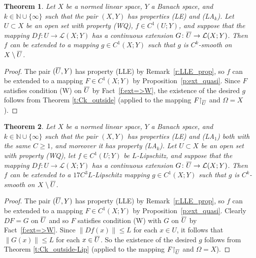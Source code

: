 \documentclass[a4paper,twoside,10pt,reqno,draft]{amsart}
\newtheorem{theorem}{Theorem}
\theoremstyle{definition}
\theoremstyle{remark}
\newcommand\norm[1]{\mathopen\|#1\mathclose\|}
\newcommand{\cl}[2][3]{{}\mkern#1mu\overline{\mkern-#1mu#2}}
\newcommand\Om{\Omega}
\newcommand\N{{\mathbb N}}
\newcommand\restr[1]{\mathclose\restriction_{#1}}
\newcommand\lin[2]{\mathcal L(#1;#2)}
\newcommand\pLA[1]{(LA$_#1$)}
\newcommand\pLLE{(LLE)}
\newcommand\pLE{(LE)}
\newcommand\pWQ{(WQ)}
\newcommand\cW{(W)}
\begin{document}
\begin{theorem}%
Let $X$ be a normed linear space, $Y$ a Banach space, and $k\in\N\cup\{\infty\}$ such that the pair $(X,Y)$ has properties {\pLE} and \pLA k.
Let $U\subset X$ be an open set with property {\pWQ}, $f\in C^1(U;Y)$, and suppose that the mapping $Df\colon U\to\lin XY$ has a continuous extension $G\colon\cl[1]U\to\lin XY$.
Then $f$ can be extended to a mapping $g\in C^1(X;Y)$ such that $g$ is $C^k$-smooth on $X\setminus\cl[1]U$.
\end{theorem}
\begin{proof}
The pair $(\cl[1]U,Y)$ has property {\pLLE} by Remark~\ref{r:LLE_prop}, so $f$ can be extended to a mapping $F\in C^1(X;Y)$ by Proposition~\ref{p:ext_quasi}.
Since $F$ satisfies condition {\cW} on $\cl[1]U$ by Fact~\ref{f:ext=>W}, the existence of the desired $g$ follows from Theorem \ref{t:Ck_outside} (applied to the mapping $F\restr{\cl[1]U}$ and $\Om=X$).
\end{proof}

\begin{theorem}\label{t:quasibasic-Lip}
Let $X$ be a normed linear space, $Y$ a Banach space, and $k\in\N\cup\{\infty\}$ such that the pair $(X,Y)$ has properties {\pLE} and \pLA 1 both with the same $C\ge1$,
and moreover it has property \pLA k.
Let $U\subset X$ be an open set with property {\pWQ}, let $f\in C^1(U;Y)$ be $L$-Lipschitz, and suppose that the mapping $Df\colon U\to\lin XY$ has a continuous extension $G\colon\cl[1]U\to\lin XY$.
Then $f$ can be extended to a $17C^3L$-Lipschitz mapping $g\in C^1(X;Y)$ such that $g$ is $C^k$-smooth on $X\setminus\cl[1]U$.
\end{theorem}
\begin{proof}
The pair $(\cl[1]U,Y)$ has property {\pLLE} by Remark~\ref{r:LLE_prop}, so $f$ can be extended to a mapping $F\in C^1(X;Y)$ by Proposition~\ref{p:ext_quasi}.
Clearly $DF=G$ on $\cl[1]U$ and so $F$ satisfies condition {\cW} with $G$ on $\cl[1]U$ by Fact~\ref{f:ext=>W}.
Since $\norm{Df(x)}\le L$ for each $x\in U$, it follows that $\norm{G(x)}\le L$ for each $x\in\cl[1]U$.
So the existence of the desired $g$ follows from Theorem \ref{t:Ck_outside-Lip} (applied to the mapping $F\restr{\cl[1]U}$ and $\Om=X$).
\end{proof}
\end{document}
